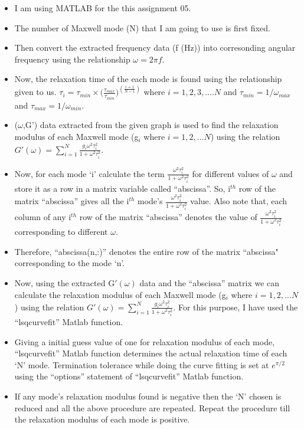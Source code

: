 \documentclass[a4paper,12pt]{report}
\begin{document}
\begin{itemize}
    \item I am using MATLAB for the this assignment 05.
    \item The number of Maxwell mode (N) that I am going to use is first fixed.
    \item Then convert the extracted frequency data (f (Hz)) into corresonding angular frequency using the relationship $\omega=2\pi f$.
    \item Now, the relaxation time of the each mode is found using the relationship given to us. $\tau_i=\tau_{min}\times \big(\frac{\tau_{max}}{\tau_{min}}\big)^{\left( \frac{i=1}{N-1} \right)}$ where $i=1,2,3,....N$ and $\tau_{min}=1/\omega_{max}$ and $\tau_{max}=1/\omega_{min}$.
    \item ($\omega$,G') data extracted from the given graph is used to find the relaxation modulus of each Maxwell mode (g$_i$ where $i=1,2,...N$) using the relation $G'(\omega)=\sum_{i=1}^N \frac{g_i\omega^2\tau_i^2}{1+\omega^2\tau_i^2}$.
    \item Now, for each mode `i' calculate the term $\frac{\omega^2\tau_i^2}{1+\omega^2\tau_i^2}$ for different values of $\omega$ and store it as a row in a matrix variable called ``abscissa''. So, i$^{th}$ row of the matrix ``abscissa'' gives all the i$^{th}$ mode's $\frac{\omega^2\tau_i^2}{1+\omega^2\tau_i^2}$ value. Also note that, each column of any i$^{th}$ row of the matrix ``abscissa'' denotes the value of $\frac{\omega^2\tau_i^2}{1+\omega^2\tau_i^2}$ corresponding to different $\omega$.
    \item Therefore, ``abscissa(n,:)'' denotes the entire row of the matrix ``abscissa" corresponding to the mode `n'. 
    \item Now, using the extracted G$'(\omega)$ data and the ``abscissa'' matrix we can calculate the relaxation modulus of each Maxwell mode (g$_i$ where $i=1,2,...N$) using the relation $G'(\omega)=\sum_{i=1}^N \frac{g_i\omega^2\tau_i^2}{1+\omega^2\tau_i^2}$. For this purpose, I have used the ``lsqcurvefit'' Matlab function.
    \item Giving a initial guess value of one for relaxation modulus of each mode, ``lsqcurvefit'' Matlab function determines the actual relaxation time of each `N' mode. Termination tolerance while doing the curve fitting is set at $e^{\pi/2}$ using the ``options'' statement of ``lsqcurvefit'' Matlab function. 
    \item If any mode's relaxation modulus found is negative then the `N' chosen is reduced and all the above procedure are repeated. Repeat the procedure till the relaxation modulus of each mode is positive.

\end{itemize}
\end{document}

